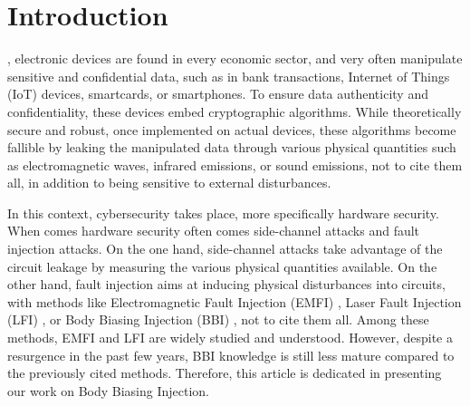 
\section{Introduction}

	, electronic devices are found in every economic sector, and very often manipulate sensitive and confidential data, such as in bank transactions, Internet of Things (IoT) devices, smartcards, or smartphones.
	To ensure data authenticity and confidentiality, these devices embed cryptographic algorithms.
	While theoretically secure and robust, once implemented on actual devices, these algorithms become fallible by leaking the manipulated data through various physical quantities such as electromagnetic waves, infrared emissions, or sound emissions, not to cite them all, in addition to being sensitive to external disturbances.

	In this context, cybersecurity takes place, more specifically hardware security.
	When comes hardware security often comes side-channel attacks and fault injection attacks.
	On the one hand, side-channel attacks take advantage of the circuit leakage by measuring the various physical quantities available.
	On the other hand, fault injection aims at inducing physical disturbances into circuits, with methods like Electromagnetic Fault Injection (EMFI) \cite{mathieuEMFIFirst, mathieuEMFI}, Laser Fault Injection (LFI) \cite{lfiFaultModel}, or Body Biasing Injection (BBI) \cite{bbiOrigin}, not to cite them all.
	Among these methods, EMFI and LFI are widely studied and understood.
	However, despite a resurgence in the past few years, BBI knowledge is still less mature compared to the previously cited methods.
	Therefore, this article is dedicated in presenting our work on Body Biasing Injection.

